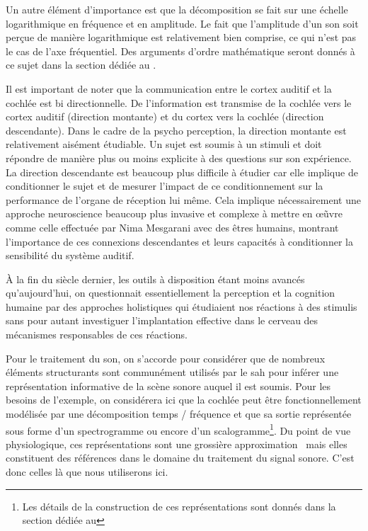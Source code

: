 Un autre élément d'importance est que la décomposition se fait sur une échelle logarithmique en fréquence et en amplitude. Le fait que l'amplitude d'un son soit perçue de manière logarithmique est relativement bien comprise, ce qui n'est pas le cas de l'axe fréquentiel. Des arguments d'ordre mathématique seront donnés à ce sujet dans la section dédiée au .

Il est important de noter que la communication entre le cortex auditif et la cochlée est bi directionnelle. De l'information est transmise de la cochlée vers le cortex auditif (direction montante) et du cortex vers la cochlée (direction descendante). Dans le cadre de la psycho perception, la direction montante est relativement aisément étudiable. Un sujet est soumis à un stimuli et doit répondre de manière plus ou moins explicite à des questions sur son expérience. La direction descendante est beaucoup plus difficile à étudier car elle implique de conditionner le sujet et de mesurer l'impact de ce conditionnement sur la performance de l'organe de réception lui même. Cela implique nécessairement une approche \og neuroscience \fg beaucoup plus invasive et complexe à mettre en \oe\~uvre comme celle effectuée par Nima Mesgarani avec des êtres humains, montrant l'importance de ces connexions descendantes et leurs capacités à conditionner la sensibilité du système auditif\cite{mesgarani2012selective}.

\`A la fin du siècle dernier, les outils à disposition étant moins avancés qu'aujourd'hui, on questionnait essentiellement la perception et la cognition humaine par des approches \og holistiques \fg qui étudiaient nos réactions à des stimulis sans pour autant investiguer l'implantation effective dans le cerveau des mécanismes responsables de ces réactions.

Pour le traitement du son, on s'accorde pour considérer que de nombreux éléments structurants sont communément utilisés par le sah pour inférer une représentation informative de la scène sonore auquel il est soumis. Pour les besoins de l'exemple, on considérera ici que la cochlée peut être fonctionnellement modélisée par une décomposition temps / fréquence et que sa sortie représentée sous forme d'un spectrogramme ou encore d'un scalogramme\footnote{Les détails de la construction de ces représentations sont donnés dans la section dédiée au }. Du point de vue physiologique, ces représentations sont une grossière approximation~\cite{lyon2017human} mais elles constituent des références dans le domaine du traitement du signal sonore. C'est donc celles là que nous utiliserons ici.

